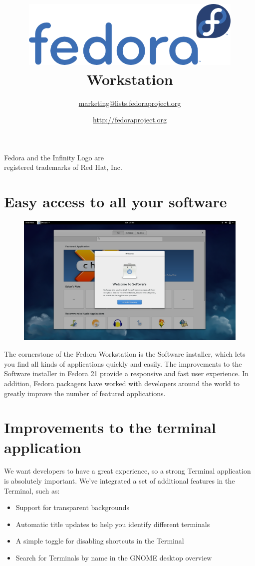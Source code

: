 \documentclass[
10pt
]{leaflet}
\title{\includegraphics[keepaspectratio,width=0.8\textwidth]{Logo_fedoralogo.png}\vspace{1cm}\\Workstation}
\date{\Large{\textcolor{FedoraBlue}{\href{http://fedoraproject.org}{http://fedoraproject.org}}}}
\author{\href{mailto:marketing@lists.fedoraproject.org}{marketing@lists.fedoraproject.org}}
\begin{document}
\maketitle
\thispagestyle{empty}
\vspace{6cm}
\begin{center}\small{Fedora and the Infinity Logo are\\registered trademarks of Red Hat, Inc.}\end{center}

\newpage


\section{\textcolor{FedoraBlue}{Easy access to all your software}}
\begin{figure}[h]
  \includegraphics[keepaspectratio,width=\textwidth]{Gnome_software_welcome.png}
\end{figure}
The cornerstone of the Fedora Workstation is the Software installer, which lets you find all kinds of applications quickly and easily. The improvements to the Software installer in Fedora 21 provide a responsive and fast user experience. In addition, Fedora packagers have worked with developers around the world to greatly improve the number of featured applications.

\section{\textcolor{FedoraBlue}{Improvements to the terminal application}}

We want developers to have a great experience, so a strong Terminal application is absolutely important. We've integrated a set of additional features in the Terminal, such as:
\begin{itemize}
  \item Support for transparent backgrounds
  \item Automatic title updates to help you identify different terminals
  \item A simple toggle for disabling shortcuts in the Terminal
  \item Search for Terminals by name in the GNOME desktop overview
\end{itemize}
\end{document}
